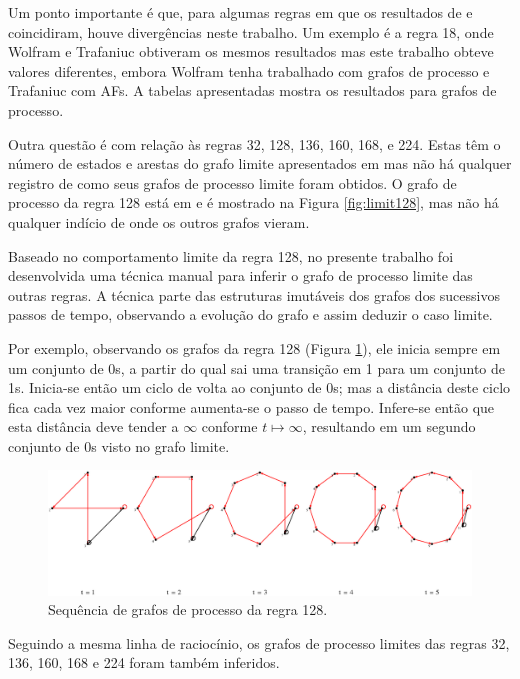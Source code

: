 \documentclass[12pt,a4paper]{article}
\begin{document}
Um ponto importante é que, para algumas regras em que os resultados de
 e  coincidiram, houve
divergências neste trabalho. Um exemplo é a regra 18, onde Wolfram e
Trafaniuc obtiveram os mesmos resultados mas este trabalho obteve valores
diferentes, embora Wolfram tenha trabalhado com grafos de processo e Trafaniuc
com AFs. A tabelas apresentadas mostra os resultados para grafos de processo.

Outra questão é com relação às regras 32, 128, 136, 160, 168, e 224. Estas têm
o número de estados e arestas do grafo limite apresentados em
 mas não há qualquer registro de como seus grafos
de processo limite foram obtidos. O grafo de processo da regra 128 está
em  e é mostrado na Figura \ref{fig:limit128}, mas
não há qualquer indício de onde os outros grafos vieram.

Baseado no comportamento limite da regra 128, no presente trabalho foi
desenvolvida uma técnica manual para inferir o grafo de processo limite
das outras regras.  A técnica parte das estruturas imutáveis dos grafos
dos sucessivos passos de tempo, observando a evolução do grafo e assim
deduzir o caso limite.

Por exemplo, observando os grafos da regra 128 (Figura \ref{fig:r128ta}), ele
inicia sempre em um conjunto de 0s, a partir do qual sai uma transição em 1 para um
conjunto de 1s. Inicia-se então um ciclo de volta ao conjunto de 0s; mas a
distância deste ciclo fica cada vez maior conforme aumenta-se o passo de
tempo. Infere-se então que esta distância deve tender a $\infty$ conforme
$t \mapsto \infty$, resultando em um segundo conjunto de 0s visto no grafo
limite.

\begin{figure}[H]
\begin{center}
\includegraphics[scale=0.55]{img/Rule128.eps}
\caption{Sequência de grafos de processo da regra 128.}
\label{fig:r128ta}
\end{center}
\end{figure}

Seguindo a mesma linha de raciocínio, os grafos de processo limites das
regras 32, 136, 160, 168 e 224 foram também inferidos.
\end{document}
